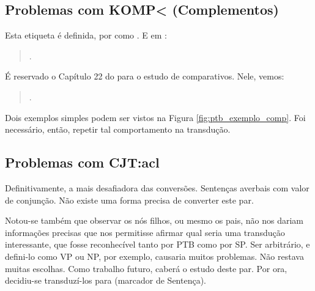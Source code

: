 \subsection{Problemas com KOMP< (Complementos)}
\label{subsec:tag_komp}
Esta etiqueta é definida, por \cite[p~57]{afonso2006arvores} como . E em \cite[p~116]{afonso2006arvores}:
\begin{quote}
    .
\end{quote}

É reservado o Capítulo 22 do \cite[p~284]{bracketing_ptb} para o estudo de comparativos. Nele, vemos:
\begin{quote}
    .
\end{quote}

Dois exemplos simples podem ser vistos na Figura \ref{fig:ptb_exemplo_comp}. Foi necessário, então, repetir tal comportamento na transdução.
\begin{center}
    
\end{center}
\subsection{Problemas com CJT:acl}
\label{subsec:CJT_acl}
Definitivamente, a mais desafiadora das conversões. Sentenças averbais com valor de conjunção. Não existe uma forma precisa de converter este par. 

Notou-se também que observar os nós filhos, ou mesmo os pais, não nos dariam informações precisas que nos permitisse afirmar qual seria uma transdução interessante, que fosse reconhecível tanto por PTB como por SP. Ser arbitrário, e defini-lo como VP ou NP, por exemplo, causaria muitos problemas. Não restava muitas escolhas. Como trabalho futuro, caberá o estudo deste par. Por ora, decidiu-se transduzí-los para  (marcador de Sentença).
